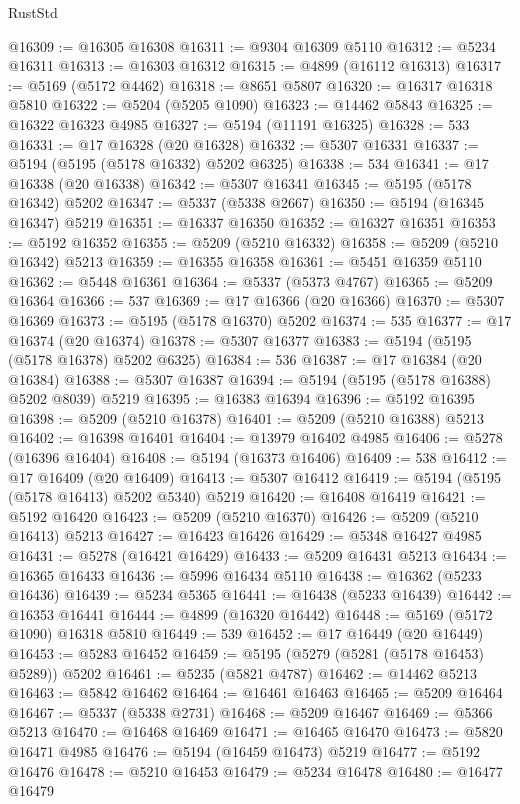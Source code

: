 \begin{lexlean}{RustStd}
\begin{coremodule}
@16309 := @16305 @16308
@16311 := @9304 @16309 @5110
@16312 := @5234 @16311
@16313 := @16303 @16312
@16315 := @4899 (@16112 @16313)
@16317 := @5169 (@5172 @4462)
@16318 := @8651 @5807
@16320 := @16317 @16318 @5810
@16322 := @5204 (@5205 @1090)
@16323 := @14462 @5843
@16325 := @16322 @16323 @4985
@16327 := @5194 (@11191 @16325)
@16328 := 533
@16331 := @17 @16328 (@20 @16328)
@16332 := @5307 @16331
@16337 := @5194 (@5195 (@5178 @16332) @5202 @6325)
@16338 := 534
@16341 := @17 @16338 (@20 @16338)
@16342 := @5307 @16341
@16345 := @5195 (@5178 @16342) @5202
@16347 := @5337 (@5338 @2667)
@16350 := @5194 (@16345 @16347) @5219
@16351 := @16337 @16350
@16352 := @16327 @16351
@16353 := @5192 @16352
@16355 := @5209 (@5210 @16332)
@16358 := @5209 (@5210 @16342) @5213
@16359 := @16355 @16358
@16361 := @5451 @16359 @5110
@16362 := @5448 @16361
@16364 := @5337 (@5373 @4767)
@16365 := @5209 @16364
@16366 := 537
@16369 := @17 @16366 (@20 @16366)
@16370 := @5307 @16369
@16373 := @5195 (@5178 @16370) @5202
@16374 := 535
@16377 := @17 @16374 (@20 @16374)
@16378 := @5307 @16377
@16383 := @5194 (@5195 (@5178 @16378) @5202 @6325)
@16384 := 536
@16387 := @17 @16384 (@20 @16384)
@16388 := @5307 @16387
@16394 := @5194 (@5195 (@5178 @16388) @5202 @8039) @5219
@16395 := @16383 @16394
@16396 := @5192 @16395
@16398 := @5209 (@5210 @16378)
@16401 := @5209 (@5210 @16388) @5213
@16402 := @16398 @16401
@16404 := @13979 @16402 @4985
@16406 := @5278 (@16396 @16404)
@16408 := @5194 (@16373 @16406)
@16409 := 538
@16412 := @17 @16409 (@20 @16409)
@16413 := @5307 @16412
@16419 := @5194 (@5195 (@5178 @16413) @5202 @5340) @5219
@16420 := @16408 @16419
@16421 := @5192 @16420
@16423 := @5209 (@5210 @16370)
@16426 := @5209 (@5210 @16413) @5213
@16427 := @16423 @16426
@16429 := @5348 @16427 @4985
@16431 := @5278 (@16421 @16429)
@16433 := @5209 @16431 @5213
@16434 := @16365 @16433
@16436 := @5996 @16434 @5110
@16438 := @16362 (@5233 @16436)
@16439 := @5234 @5365
@16441 := @16438 (@5233 @16439)
@16442 := @16353 @16441
@16444 := @4899 (@16320 @16442)
@16448 := @5169 (@5172 @1090) @16318 @5810
@16449 := 539
@16452 := @17 @16449 (@20 @16449)
@16453 := @5283 @16452
@16459 := @5195 (@5279 (@5281 (@5178 @16453) @5289)) @5202
@16461 := @5235 (@5821 @4787)
@16462 := @14462 @5213
@16463 := @5842 @16462
@16464 := @16461 @16463
@16465 := @5209 @16464
@16467 := @5337 (@5338 @2731)
@16468 := @5209 @16467
@16469 := @5366 @5213
@16470 := @16468 @16469
@16471 := @16465 @16470
@16473 := @5820 @16471 @4985
@16476 := @5194 (@16459 @16473) @5219
@16477 := @5192 @16476
@16478 := @5210 @16453
@16479 := @5234 @16478
@16480 := @16477 @16479

\end{coremodule}
\end{lexlean}
